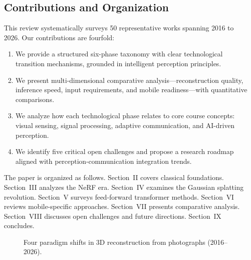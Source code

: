 \documentclass[journal]{IEEEtran}
\begin{document}
\subsection{Contributions and Organization}

This review systematically surveys 50 representative works spanning 2016 to 2026. Our contributions are fourfold:
\begin{enumerate}
    \item We provide a structured six-phase taxonomy with clear technological transition mechanisms, grounded in intelligent perception principles.
    \item We present multi-dimensional comparative analysis---reconstruction quality, inference speed, input requirements, and mobile readiness---with quantitative comparisons.
    \item We analyze how each technological phase relates to core course concepts: visual sensing, signal processing, adaptive communication, and AI-driven perception.
    \item We identify five critical open challenges and propose a research roadmap aligned with perception-communication integration trends.
\end{enumerate}

The paper is organized as follows. Section~II covers classical foundations. Section~III analyzes the NeRF era. Section~IV examines the Gaussian splatting revolution. Section~V surveys feed-forward transformer methods. Section~VI reviews mobile-specific approaches. Section~VII presents comparative analysis. Section~VIII discusses open challenges and future directions. Section~IX concludes.

\begin{figure}[t]
\centering
{}
\caption{Four paradigm shifts in 3D reconstruction from photographs (2016--2026).}
\label{fig:timeline}
\end{figure}
\end{document}
